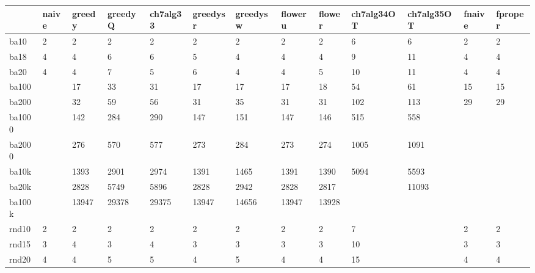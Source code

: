 \begin{landscape}

\begin{table}[h]
	\centering
	\begin{tabular}{lllllllllllll}
		\hline
		& naive & greedy & greedyQ & ch7alg33 & greedysr & greedysw & floweru & flower & ch7alg34OT & ch7alg35OT & fnaive & fproper \\ \hline
		ba10    & 2     & 2      & 2       & 2        & 2        & 2        & 2       & 2      & 6          & 6          & 2      & 2       \\
		ba18    & 4     & 4      & 6       & 6        & 5        & 4        & 4       & 4      & 9          & 11         & 4      & 4       \\
		ba20    & 4     & 4      & 7       & 5        & 6        & 4        & 4       & 5      & 10         & 11         & 4      & 4       \\
		ba100   &       & 17     & 33      & 31       & 17       & 17       & 17      & 18     & 54         & 61         & 15     & 15      \\
		ba200   &       & 32     & 59      & 56       & 31       & 35       & 31      & 31     & 102        & 113        & 29     & 29      \\
		ba1000  &       & 142    & 284     & 290      & 147      & 151      & 147     & 146    & 515        & 558        &        &         \\
		ba2000  &       & 276    & 570     & 577      & 273      & 284      & 273     & 274    & 1005       & 1091       &        &         \\
		ba10k   &       & 1393   & 2901    & 2974     & 1391     & 1465     & 1391    & 1390   & 5094       & 5593       &        &         \\
		ba20k   &       & 2828   & 5749    & 5896     & 2828     & 2942     & 2828    & 2817   &            & 11093      &        &         \\
		ba100k  &       & 13947  & 29378   & 29375    & 13947    & 14656    & 13947   & 13928  &            &            &        &         \\
		rnd10   & 2     & 2      & 2       & 2        & 2        & 2        & 2       & 2      & 7          &            & 2      & 2       \\
		rnd15   & 3     & 4      & 3       & 4        & 3        & 3        & 3       & 3      & 10         &            & 3      & 3       \\
		rnd20   & 4     & 4      & 5       & 5        & 4        & 5        & 4       & 4      & 15         &            & 4      & 4       \\

\end{tabular}
\end{table}
\end{landscape}
